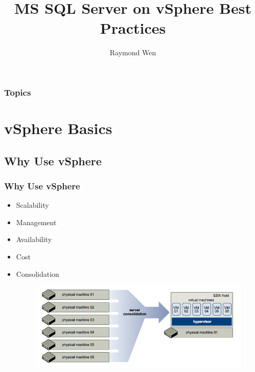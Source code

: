 \documentclass[CJK]{beamer}
\title[MS SQL Server on vSphere Best Practices]{MS SQL Server on vSphere Best Practices}
\author{Raymond Wen}
\begin{document}
\begin{frame}
    \titlepage
\end{frame}

\begin{frame}
    \frametitle{Topics}
    \tableofcontents[pausesections]
\end{frame}

\section{vSphere Basics}
\subsection{Why Use vSphere}
\begin{frame}[t]
    \frametitle{Why Use vSphere}
        \begin{itemize}
            \item Scalability
            \item Management
            \item Availability
            \item Cost
            \item Consolidation
            \pause
            \begin{figure}[b]
                \includegraphics[width=\textwidth]{"server_consolidation.png"}
            \end{figure}
        \end{itemize}
\end{frame}
\end{document}

